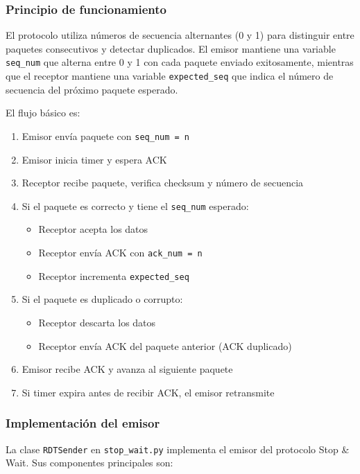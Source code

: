 \subsubsection{Principio de funcionamiento}

El protocolo utiliza números de secuencia alternantes (0 y 1) para distinguir entre paquetes consecutivos y detectar duplicados. El emisor mantiene una variable \texttt{seq\_num} que alterna entre 0 y 1 con cada paquete enviado exitosamente, mientras que el receptor mantiene una variable \texttt{expected\_seq} que indica el número de secuencia del próximo paquete esperado.

El flujo básico es:
\begin{enumerate}
    \item Emisor envía paquete con \texttt{seq\_num = n}
    \item Emisor inicia timer y espera ACK
    \item Receptor recibe paquete, verifica checksum y número de secuencia
    \item Si el paquete es correcto y tiene el \texttt{seq\_num} esperado:
    \begin{itemize}
        \item Receptor acepta los datos
        \item Receptor envía ACK con \texttt{ack\_num = n}
        \item Receptor incrementa \texttt{expected\_seq}
    \end{itemize}
    \item Si el paquete es duplicado o corrupto:
    \begin{itemize}
        \item Receptor descarta los datos
        \item Receptor envía ACK del paquete anterior (ACK duplicado)
    \end{itemize}
    \item Emisor recibe ACK y avanza al siguiente paquete
    \item Si timer expira antes de recibir ACK, el emisor retransmite
\end{enumerate}

\subsubsection{Implementación del emisor}

La clase \texttt{RDTSender} en \texttt{stop\_wait.py} implementa el emisor del protocolo Stop \& Wait. Sus componentes principales son:

